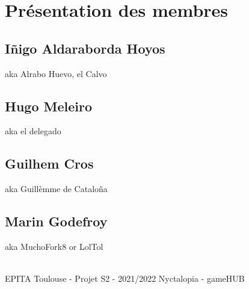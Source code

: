 \section{Présentation des membres}

\subsection{Iñigo Aldaraborda Hoyos}
aka Alrabo Huevo, el Calvo

\subsection{Hugo Meleiro}
aka el delegado

\subsection{Guilhem Cros}
aka Guillèmme de Cataloña

\subsection{Marin Godefroy}
aka MuchoFork8 or LolTol

\vfill
\noindent\makebox[\linewidth]{\rule{.8\paperwidth}{.6pt}}\\[0.2cm]
EPITA Toulouse - Projet S2 - 2021/2022 \hfill Nyctalopia - gameHUB
\noindent\makebox[\linewidth]{\rule{.8\paperwidth}{.6pt}}

\newpage